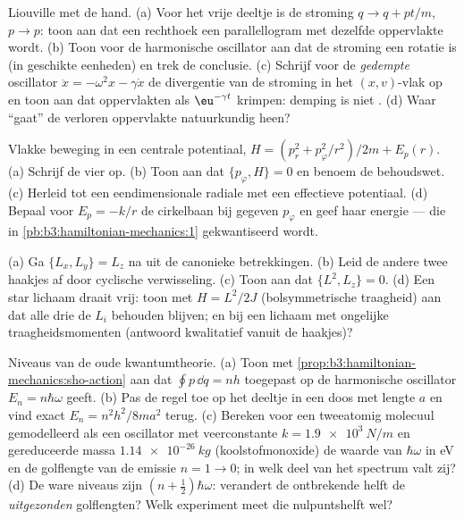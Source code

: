 \begin{exercise}[$\star\star$]\label{exo:b3:hamiltonian-mechanics:7}
Liouville met de hand. (a) Voor het vrije deeltje is de stroming $q \to q +
pt/m$, $p \to p$: toon aan dat een rechthoek een parallellogram met
dezelfde oppervlakte wordt. (b) Toon voor de harmonische oscillator aan
dat de stroming een rotatie is (in geschikte eenheden) en trek de
conclusie. (c) Schrijf voor de \emph{gedempte} oscillator $\ddot x = -\omega^2x - \gamma\dot x$ de divergentie van de stroming in het
$(x, v)$-vlak op en toon aan dat oppervlakten als $\eu^{-\gamma t}$
krimpen: demping is niet . (d) Waar ``gaat'' de verloren
oppervlakte natuurkundig heen?
\end{exercise}

\begin{exercise}[$\star\star$]\label{exo:b3:hamiltonian-mechanics:8}
Vlakke beweging in een centrale potentiaal, $H = (p_r^2 + p_\varphi^2/r^2)/2m
+ E_p(r)$. (a) Schrijf de vier  op. (b) Toon aan dat $\{
p_\varphi, H\} = 0$ en benoem de
behoudswet. (c) Herleid tot een eendimensionale radiale  met
een effectieve potentiaal. (d) Bepaal voor $E_p = -k/r$ de cirkelbaan bij
gegeven $p_\varphi$ en geef haar energie --- die in
\cref{pb:b3:hamiltonian-mechanics:1} gekwantiseerd wordt.
\end{exercise}

\begin{exercise}[$\star\star$]\label{exo:b3:hamiltonian-mechanics:9}
(a) Ga $\{L_x, L_y\} = L_z$ na uit de canonieke betrekkingen. (b) Leid de
andere twee haakjes af door cyclische verwisseling. (c) Toon aan dat
$\{L^2, L_z\} = 0$. (d) Een star lichaam draait vrij: toon met $H =
L^2/2J$ (bolsymmetrische traagheid) aan dat alle drie de $L_i$ behouden
blijven; en bij een lichaam met ongelijke traagheidsmomenten (antwoord
kwalitatief vanuit de haakjes)?
\end{exercise}

\begin{exercise}[$\star\star\star$]\label{exo:b3:hamiltonian-mechanics:10}
Niveaus van de oude kwantumtheorie. (a) Toon met
\cref{prop:b3:hamiltonian-mechanics:sho-action} aan dat $\oint p\,\dd q = nh$ toegepast op de harmonische oscillator $E_n = n\hbar\omega$ geeft.
(b) Pas de regel toe op het deeltje in een doos met lengte $a$ en vind
exact $E_n =
n^2h^2/8ma^2$ terug. (c) Bereken voor een tweeatomig molecuul
gemodelleerd als een oscillator met veerconstante $k = \qty{1.9e3}{N/m}$
en gereduceerde massa $\qty{1.14e-26}
{kg}$ (koolstofmonoxide) de waarde
van $\hbar\omega$ in eV en de golflengte van de emissie $n = 1 \to 0$; in
welk deel van het spectrum valt zij? (d) De ware niveaus zijn $(n + \tfrac12)\hbar\omega$: verandert de ontbrekende helft de \emph{uitgezonden}
golflengten? Welk experiment meet die nulpuntshelft wel?
\end{exercise}

